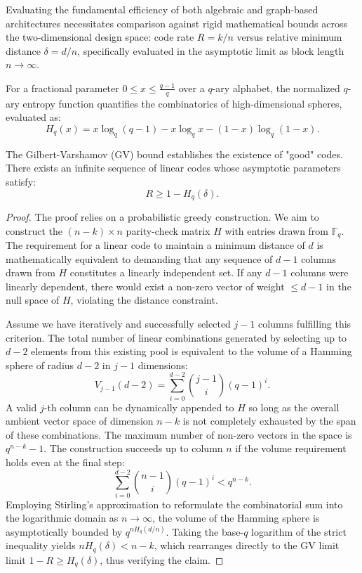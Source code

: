 Evaluating the fundamental efficiency of both algebraic and graph-based architectures necessitates comparison against rigid mathematical bounds across the two-dimensional design space: code rate $R = k/n$ versus relative minimum distance $\delta = d/n$, specifically evaluated in the asymptotic limit as block length $n \to \infty$.

\begin{definition}
For a fractional parameter $0 \le x \le \frac{q-1}{q}$ over a $q$-ary alphabet, the normalized $q$-ary entropy function quantifies the combinatorics of high-dimensional spheres, evaluated as:
\[
H_q(x) = x \log_q(q-1) - x \log_q x - (1-x) \log_q(1-x).
\]
\end{definition}

\begin{theorem}
\label{thm:gv_bound}
The Gilbert-Varshamov (GV) bound establishes the existence of "good" codes. There exists an infinite sequence of linear codes whose asymptotic parameters satisfy:
\[
R \ge 1 - H_q(\delta).
\]
\end{theorem}

\begin{proof}
The proof relies on a probabilistic greedy construction. We aim to construct the $(n-k) \times n$ parity-check matrix $H$ with entries drawn from $\mathbb{F}_q$. The requirement for a linear code to maintain a minimum distance of $d$ is mathematically equivalent to demanding that any sequence of $d-1$ columns drawn from $H$ constitutes a linearly independent set. If any $d-1$ columns were linearly dependent, there would exist a non-zero vector of weight $\le d-1$ in the null space of $H$, violating the distance constraint.

Assume we have iteratively and successfully selected $j-1$ columns fulfilling this criterion. The total number of linear combinations generated by selecting up to $d-2$ elements from this existing pool is equivalent to the volume of a Hamming sphere of radius $d-2$ in $j-1$ dimensions:
\[
V_{j-1}(d-2) = \sum_{i=0}^{d-2} \binom{j-1}{i} (q-1)^i.
\]
A valid $j$-th column can be dynamically appended to $H$ so long as the overall ambient vector space of dimension $n-k$ is not completely exhausted by the span of these combinations. The maximum number of non-zero vectors in the space is $q^{n-k} - 1$.
The construction succeeds up to column $n$ if the volume requirement holds even at the final step:
\[
\sum_{i=0}^{d-2} \binom{n-1}{i} (q-1)^i < q^{n-k}.
\]
Employing Stirling's approximation to reformulate the combinatorial sum into the logarithmic domain as $n \to \infty$, the volume of the Hamming sphere is asymptotically bounded by $q^{n H_q(d/n)}$. Taking the base-$q$ logarithm of the strict inequality yields $n H_q(\delta) < n - k$, which rearranges directly to the GV limit limit $1 - R \ge H_q(\delta)$, thus verifying the claim.
\end{proof}

